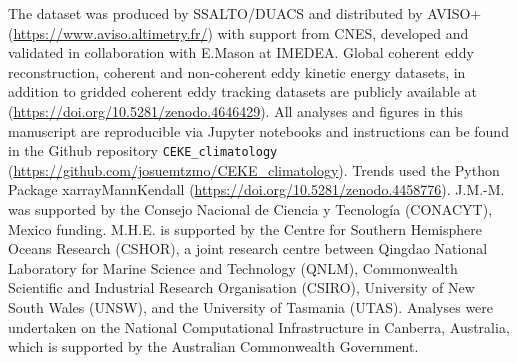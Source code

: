 \documentclass[draft,linenumbers]{agujournal2019}
\begin{document}
	\acknowledgments
	The \citet{Chelton_mesoscale_2013} dataset was produced by SSALTO/DUACS and distributed by AVISO+ (\url{https://www.aviso.altimetry.fr/}) with support from CNES, developed and validated in collaboration with E.Mason at IMEDEA.
	Global coherent eddy reconstruction, coherent and non-coherent eddy kinetic energy datasets, in addition to gridded coherent eddy tracking datasets are publicly available at (\url{https://doi.org/10.5281/zenodo.4646429}).
	All analyses and figures in this manuscript are reproducible via Jupyter notebooks and instructions can be found in the Github repository \texttt{CEKE\_climatology} (\url{https://github.com/josuemtzmo/CEKE_climatology}). Trends used the Python Package xarrayMannKendall (\url{https://doi.org/10.5281/zenodo.4458776}). J.M.-M. was supported by the Consejo Nacional de Ciencia y Tecnolog\'ia (CONACYT), Mexico funding. M.H.E. is supported by the Centre for Southern Hemisphere Oceans Research (CSHOR), a joint research centre between Qingdao National Laboratory for Marine Science and Technology (QNLM), Commonwealth Scientific and Industrial Research Organisation (CSIRO), University of New South Wales (UNSW), and the University of Tasmania (UTAS).  Analyses were undertaken on the National Computational Infrastructure in Canberra, Australia, which is supported by the Australian Commonwealth Government. 
	
	
	
\end{document}
